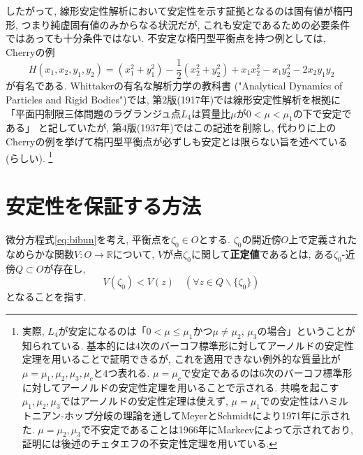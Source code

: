 \documentclass[a4paper]{ujarticle}
\theoremstyle{definition}
\begin{document}
    したがって, 線形安定性解析において安定性を示す証拠となるのは固有値が楕円形, 
    つまり純虚固有値のみからなる状況だが, これも安定であるための必要条件ではあっても十分条件ではない.
    不安定な楕円型平衡点を持つ例としては, Cherryの例
    \begin{equation} \label{eq:Cherry}
        H(x_1, x_2, y_1, y_2) = (x_1^2 + y_1^2) - \frac{1}{2}(x_2^2 + y_2^2) + x_1 x_2^2 - x_1 y_2^2 - 2 x_2 y_1 y_2
    \end{equation}
    が有名である. 
    Whittakerの有名な解析力学の教科書 ("Analytical Dynamics of Particles and Rigid Bodies")では, 
    第$2$版(1917年)では線形安定性解析を根拠に「平面円制限三体問題のラグランジュ点$L_4$は質量比$\mu$が$0 < \mu < \mu_1$の下で安定である」
    と記していたが, 第$4$版(1937年)ではこの記述を削除し, 代わりに上のCherryの例を挙げて楕円型平衡点が必ずしも安定とは限らない旨を述べている(らしい).
    \footnote{実際, $L_4$が安定になるのは「$0 < \mu \leq \mu_1$かつ$\mu \neq \mu_2, \, \mu_3$の場合」ということが知られている. 基本的には$4$次のバーコフ標準形に対してアーノルドの安定性定理を用いることで証明できるが, これを適用できない例外的な質量比が$\mu = \mu_1, \mu_2, \mu_3, \mu_c$と$4$つ表れる.
    $\mu = \mu_c$で安定であるのは$6$次のバーコフ標準形に対してアーノルドの安定性定理を用いることで示される. 共鳴を起こす$\mu_1, \mu_2, \mu_3$ではアーノルドの安定性定理は使えず, $\mu = \mu_1$での安定性はハミルトニアン-ホップ分岐の理論を通してMeyerとSchmidtにより1971年に示された. 
    $\mu = \mu_2, \mu_3$で不安定であることは1966年にMarkeevによって示されており, 証明には後述のチェタエフの不安定性定理を用いている.}

    \section{安定性を保証する方法}

    微分方程式\eqref{eq:bibun}を考え, 平衡点を$\zeta_0 \in O$とする.
    $\zeta_0$の開近傍$O$上で定義されたなめらかな関数$V : O \rightarrow \mathbb{R}$について,
    $V$が点$\zeta_0$に関して\textbf{正定値}であるとは, ある$\zeta_0$-近傍$Q \subset O$が存在し,
    \[
        V(\zeta_0) < V(z) \quad(\forall z \in Q \backslash \{\zeta_0\})
    \]
    となることを指す.
\end{document}
